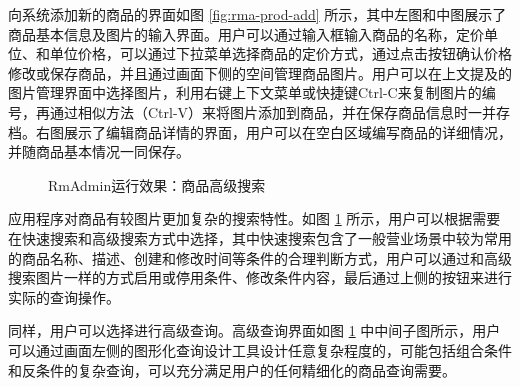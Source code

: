 向系统添加新的商品的界面如图 \ref{fig:rma-prod-add} 所示，其中左图和中图展示了商品基本信息及图片的输入界面。用户可以通过输入框输入商品的名称，定价单位、和单位价格，可以通过下拉菜单选择商品的定价方式，通过点击按钮确认价格修改或保存商品，并且通过画面下侧的空间管理商品图片。用户可以在上文提及的图片管理界面中选择图片，利用右键上下文菜单或快捷键Ctrl-C来复制图片的编号，再通过相似方法（Ctrl-V）来将图片添加到商品，并在保存商品信息时一并存档。右图展示了编辑商品详情的界面，用户可以在空白区域编写商品的详细情况，并随商品基本情况一同保存。

\begin{figure}[htbp]
    \hfill
    \hfill
	\caption{RmAdmin运行效果：商品高级搜索}
	\label{fig:rma-prod-as}
\end{figure}

应用程序对商品有较图片更加复杂的搜索特性。如图 \ref{fig:rma-prod-as} 所示，用户可以根据需要在快速搜索和高级搜索方式中选择，其中快速搜索包含了一般营业场景中较为常用的商品名称、描述、创建和修改时间等条件的合理判断方式，用户可以通过和高级搜索图片一样的方式启用或停用条件、修改条件内容，最后通过上侧的按钮来进行实际的查询操作。

同样，用户可以选择进行高级查询。高级查询界面如图 \ref{fig:rma-prod-as} 中中间子图所示，用户可以通过画面左侧的图形化查询设计工具设计任意复杂程度的，可能包括组合条件和反条件的复杂查询，可以充分满足用户的任何精细化的商品查询需要。


